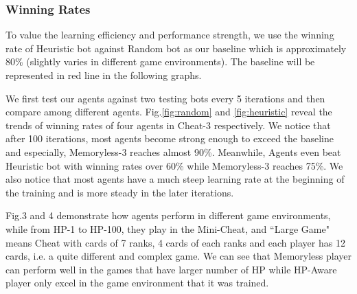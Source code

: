 \documentclass[runningheads]{llncs}
\begin{document}
    \subsubsection{Winning Rates}
    
    To value the learning efficiency and performance strength, we use the winning rate of Heuristic bot against Random bot as our baseline which is approximately 80\% (slightly varies in different game environments). The baseline will be represented in red line in the following graphs.
    
    We first test our agents against two testing bots every 5 iterations and then compare among different agents. Fig.\ref{fig:random} and \ref{fig:heuristic} reveal the trends of winning rates of four agents in Cheat-$3$ respectively. We notice that after 100 iterations, most agents become strong enough to exceed the baseline and especially, Memoryless-3 reaches almost 90\%. Meanwhile, Agents even beat Heuristic bot with winning rates over 60\% while Memoryless-3 reaches 75\%. We also notice that most agents have a much steep learning rate at the beginning of the training and is more steady in the later iterations. 
    
    Fig.3 and 4 demonstrate how agents perform in different game environments, while from HP-1 to HP-100, they play in the Mini-Cheat, and ``Large Game" means Cheat with cards of 7 ranks, 4 cards of each ranks and each player has 12 cards, i.e. a quite different and complex game. We can see that Memoryless player can perform well in the games that have larger number of HP while HP-Aware player only excel in the game environment that it was trained.
    
\end{document}
